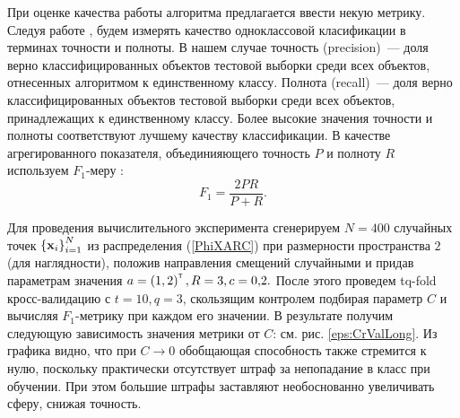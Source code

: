 
При оценке качества работы алгоритма предлагается ввести некую метрику. 
Следуя работе  \cite{Romanenko2012}, будем измерять качество одноклассовой класификации в терминах точности и полноты. 
В нашем случае точность (precision)~--- доля верно классифицированных объектов тестовой выборки среди всех объектов, отнесенных алгоритмом к единственному классу. Полнота (recall)~--- доля верно классифицированных объектов тестовой выборки среди всех объектов, принадлежащих к единственному классу. Более высокие значения точности и полноты соответствуют лучшему качеству классификации. В качестве агрегированного показателя, объединияющего точность $P$ и полноту $R$ используем $F_1$-меру \cite{Rijsbergen1979}:
$$F_1 = \frac{2PR}{P+R}.$$

Для проведения вычислительного эксперимента сгенерируем $N=400$ случайных точек $\left\{\boldsymbol{\mathbf{x}}_i\right\}_{i=1}^N$ из распределения (\ref{PhiXARC}) при размерности пространства $2$ (для наглядности), положив направления смещений случайными и придав параметрам значения $a = \left(1,2\right)^{\text{\tiny\sffamily\upshape\mdseries T}}, R = 3, c = 0{,}2.$
После этого проведем tq-fold кросс-валидацию с $t = 10, q = 3$, скользящим контролем подбирая параметр $C$ и вычисляя $F_1$-метрику при каждом его значении. В результате получим следующую зависимость значения метрики от $C$: см. рис. \ref{eps:CrValLong}.
Из графика видно, что при $C\to 0$ обобщающая способность также стремится к нулю, поскольку практически отсутствует штраф за непопадание в класс при обучении. При этом большие штрафы заставляют необоснованно увеличивать сферу, снижая точность.

